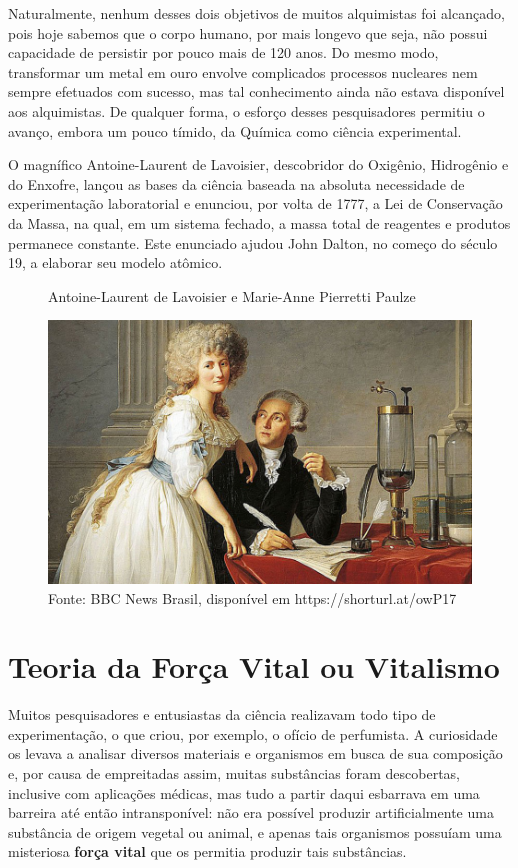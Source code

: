 \documentclass[a4paper,12pt,]{book}
\begin{document}
Naturalmente, nenhum desses dois objetivos de muitos alquimistas foi alcançado, pois hoje sabemos que o corpo humano, por mais longevo que seja, não possui capacidade de persistir por pouco mais de 120 anos. Do mesmo modo, transformar um metal em ouro envolve complicados processos nucleares nem sempre efetuados com sucesso, mas tal conhecimento ainda não estava disponível aos alquimistas. De qualquer forma, o esforço desses pesquisadores permitiu o avanço, embora um pouco tímido, da Química como ciência experimental.

O magnífico Antoine-Laurent de Lavoisier, descobridor do Oxigênio, Hidrogênio e do Enxofre, lançou as bases da ciência baseada na absoluta necessidade de experimentação laboratorial e enunciou, por volta de 1777, a Lei de Conservação da Massa, na qual, em um sistema fechado, a massa total de reagentes e produtos permanece constante. Este enunciado ajudou John Dalton, no começo do século 19, a elaborar seu modelo atômico.

\begin{figure}[h]
	\centering
	\caption{Antoine-Laurent de Lavoisier e Marie-Anne Pierretti Paulze}
	\includegraphics[width=0.85\linewidth]{imagens/figura 4.png} 
	\caption*{Fonte: BBC News Brasil, disponível em https://shorturl.at/owP17}
	\label{fig:wrapfig}
\end{figure}


\section{Teoria da Força Vital ou Vitalismo}
Muitos pesquisadores e entusiastas da ciência realizavam todo tipo de experimentação, o que criou, por exemplo, o ofício de perfumista. A curiosidade os levava a analisar diversos materiais e organismos em busca de sua composição e, por causa de empreitadas assim, muitas substâncias foram descobertas, inclusive com aplicações médicas, mas tudo a partir daqui esbarrava em uma barreira até então intransponível: não era possível produzir artificialmente uma substância de origem vegetal ou animal, e apenas tais organismos possuíam uma misteriosa \textbf{força vital}  que os permitia produzir tais substâncias.
\end{document}
